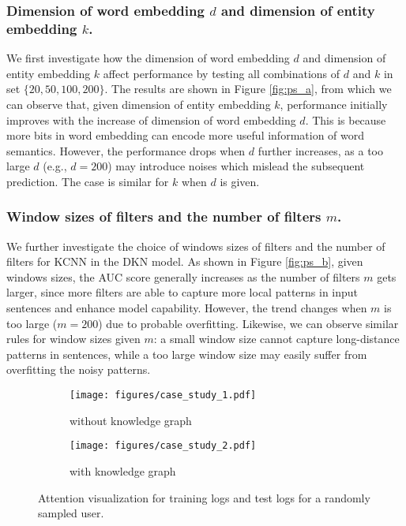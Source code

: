 \documentclass[sigconf]{acmart}
\begin{document}
		\subsubsection{Dimension of word embedding $d$ and dimension of entity embedding $k$.}
		We first investigate how the dimension of word embedding $d$ and dimension of entity embedding $k$ affect performance by testing all combinations of $d$ and $k$ in set $\{20, 50, 100, 200\}$.
		The results are shown in Figure \ref{fig:ps_a}, from which we can observe that, given dimension of entity embedding $k$, performance initially improves with the increase of dimension of word embedding $d$.
		This is because more bits in word embedding can encode more useful information of word semantics.
		However, the performance drops when $d$ further increases, as a too large $d$ (e.g., $d=200$) may introduce noises which mislead the subsequent prediction.
		The case is similar for $k$ when $d$ is given.
		
		\subsubsection{Window sizes of filters and the number of filters $m$.}
		We further investigate the choice of windows sizes of filters and the number of filters for KCNN in the DKN model.
		As shown in Figure \ref{fig:ps_b}, given windows sizes, the AUC score generally increases as the number of filters $m$ gets larger, since more filters are able to capture more local patterns in input sentences and enhance model capability.
		However, the trend changes when $m$ is too large ($m = 200$) due to probable overfitting.
		Likewise, we can observe similar rules for window sizes given $m$: a small window size cannot capture long-distance patterns in sentences, while a too large window size may easily suffer from overfitting the noisy patterns.
		
		\begin{figure}[t]
			\centering
            \begin{subfigure}[b]{0.22\textwidth}
                \texttt{[image: figures/case\_study\_1.pdf]}
                \caption{without knowledge graph}
                \label{fig:cs_a}
            \end{subfigure}
            \hfill
            \begin{subfigure}[b]{0.22\textwidth}
                \texttt{[image: figures/case\_study\_2.pdf]}
                \caption{with knowledge graph}
                \label{fig:cs_b}
            \end{subfigure}
            \caption{Attention visualization for training logs and test logs for a randomly sampled user.}
            \label{fig:case_study}
            \vspace{-0.05in}
        \end{figure}
        	
\end{document}
